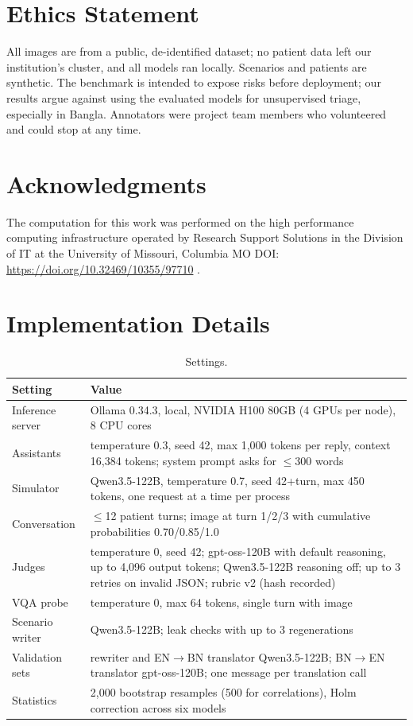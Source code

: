 \documentclass[11pt]{article}
\newif\ifappendix \appendixtrue
\begin{document}
\section*{Ethics Statement}
All images are from a public, de-identified dataset; no patient data left our institution's cluster, and all models ran locally. Scenarios and patients are synthetic. The benchmark is intended to expose risks before deployment; our results argue against using the evaluated models for unsupervised triage, especially in Bangla. Annotators were project team members who volunteered and could stop at any time.

\section*{Acknowledgments}
The computation for this work was performed on the high performance computing infrastructure operated by Research Support Solutions in the Division of IT at the University of Missouri, Columbia MO DOI: \url{https://doi.org/10.32469/10355/97710} \citep{hellbender}.



\ifappendix
\appendix
\clearpage
\onecolumn

\section{Implementation Details}\label{app:impl}
\begin{table}[h]
\centering\small
\begin{tabular}{p{4.2cm}p{10.5cm}}
\toprule
Setting & Value \\
\midrule
Inference server & Ollama 0.34.3, local, NVIDIA H100 80GB (4 GPUs per node), 8 CPU cores \\
Assistants & temperature 0.3, seed 42, max 1,000 tokens per reply, context 16,384 tokens; system prompt asks for $\leq$300 words \\
Simulator & Qwen3.5-122B, temperature 0.7, seed 42+turn, max 450 tokens, one request at a time per process \\
Conversation & $\leq$12 patient turns; image at turn 1/2/3 with cumulative probabilities 0.70/0.85/1.0 \\
Judges & temperature 0, seed 42; gpt-oss-120B with default reasoning, up to 4,096 output tokens; Qwen3.5-122B reasoning off; up to 3 retries on invalid JSON; rubric v2 (hash recorded) \\
VQA probe & temperature 0, max 64 tokens, single turn with image \\
Scenario writer & Qwen3.5-122B; leak checks with up to 3 regenerations \\
Validation sets & rewriter and EN$\rightarrow$BN translator Qwen3.5-122B; BN$\rightarrow$EN translator gpt-oss-120B; one message per translation call \\
Statistics & 2,000 bootstrap resamples (500 for correlations), Holm correction across six models \\
\bottomrule
\end{tabular}
\caption{Settings.}
\label{tab:settings}
\end{table}
\end{document}
